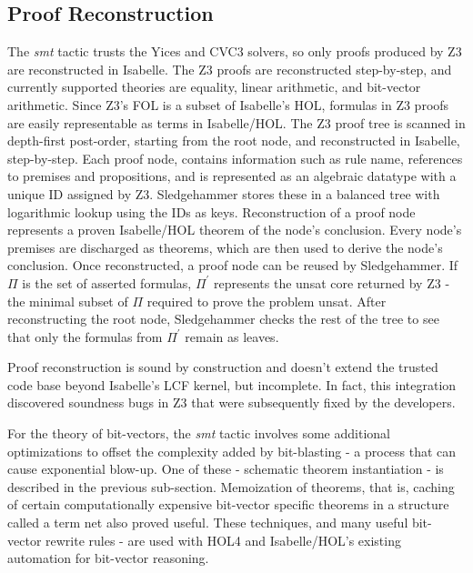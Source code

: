 \documentclass{article}
\begin{document}
	\subsection{Proof Reconstruction}
		The \textit{smt} tactic trusts the Yices 
		and CVC3 solvers, so only proofs produced 
		by Z3 are reconstructed in Isabelle.
		The Z3 proofs are reconstructed step-by-step,
		and currently supported theories are equality, 
		linear arithmetic, and bit-vector arithmetic.
		Since Z3's FOL is a subset of Isabelle's HOL,
		formulas in Z3 proofs are easily representable 
		as terms in Isabelle/HOL. The Z3 proof tree
		is scanned in depth-first post-order, starting 
		from the root node, and reconstructed in Isabelle,
		step-by-step. Each proof node, contains information 
		such as rule name, references to premises and 
		propositions, and is represented as an 
		algebraic datatype with a unique ID assigned
		by Z3. Sledgehammer stores these in a balanced 
		tree with logarithmic lookup using the IDs as
		keys. Reconstruction of a proof node 
		represents a proven Isabelle/HOL theorem of 
		the node's conclusion. Every node's 
		premises are discharged as theorems, which are then 
		used to derive the node's conclusion. Once 
		reconstructed, a proof node can be reused 
		by Sledgehammer. If $\Pi$ is the set of asserted 
		formulas, $\Pi^\prime$ represents the unsat 
		core returned by Z3 - the minimal subset of 
		$\Pi$ required to prove the problem unsat. 
		After reconstructing the root node, Sledgehammer 
		checks the rest of the tree to see that only the 
		formulas from $\Pi^\prime$ remain as leaves.
		
		Proof reconstruction is sound by construction 
		and doesn't extend the trusted code base
		beyond Isabelle's LCF kernel, but incomplete. 
		In fact, this integration discovered soundness
		bugs in Z3 that were subsequently fixed by the 
		developers.
		
		For the theory of bit-vectors, the \textit{smt}
		tactic involves some additional optimizations 
		to offset the complexity added by bit-blasting - 
		a process that can cause exponential blow-up. 
		One of these - schematic theorem instantiation - 
		is described in the previous sub-section. 
		Memoization of theorems, that is, caching of 
		certain computationally expensive bit-vector 
		specific theorems in a structure called a term net 
		also proved useful. These techniques, and many 
		useful bit-vector rewrite rules - are used 
		with HOL4 and Isabelle/HOL's existing automation
		for bit-vector reasoning.
		
\end{document}
